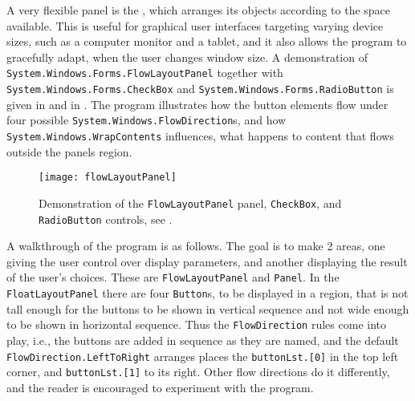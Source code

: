 A very flexible panel is the , which arranges its objects according to the space available. This is useful for graphical user interfaces targeting varying device sizes, such as a computer monitor and a tablet, and it also allows the program to gracefully adapt, when the user changes window size. A demonstration of \lstinline{System.Windows.Forms.FlowLayoutPanel} together with \lstinline{System.Windows.Forms.CheckBox} and \lstinline{System.Windows.Forms.RadioButton} is given in  and in . The program illustrates how the button elements flow under four possible \lstinline{System.Windows.FlowDirection}s, and how \lstinline{System.Windows.WrapContents} influences, what happens to content that flows outside the panels region. 
%
%
%
\begin{figure}
  \centering
  \texttt{[image: flowLayoutPanel]}
  \caption{Demonstration of the \lstinline!FlowLayoutPanel! panel, \lstinline!CheckBox!, and \lstinline!RadioButton! controls, see .}
  \label{fig:flowLayoutPanel}
\end{figure}
A walkthrough of the program is as follows. The goal is to make 2 areas, one giving the user control over display parameters, and another displaying the result of the user's choices. These are \lstinline{FlowLayoutPanel} and \lstinline{Panel}. In the \lstinline{FloatLayoutPanel} there are four \lstinline{Button}s, to be displayed in a region, that is not tall enough for the buttons to be shown in vertical sequence and not wide enough to be shown in horizontal sequence. Thus the \lstinline{FlowDirection} rules come into play, i.e., the buttons are added in sequence as they are named, and the default \lstinline{FlowDirection.LeftToRight} arranges places the \lstinline{buttonLst.[0]} in the top left corner, and \lstinline{buttonLst.[1]} to its right. Other flow directions do it differently, and the reader is encouraged to experiment with the program.

